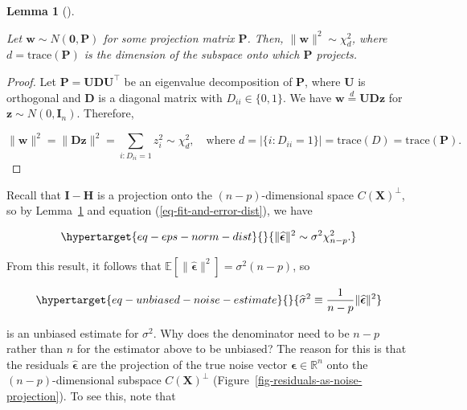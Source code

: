 \documentclass[
  11pt,
  letterpaper,
  oneside]{book}
\theoremstyle{plain}
\newtheorem{lemma}{Lemma}[chapter]
\theoremstyle{plain}
\theoremstyle{definition}
\theoremstyle{definition}
\theoremstyle{plain}
\theoremstyle{remark}
\begin{document}
\begin{lemma}[]\protect\hypertarget{lem-normal-projection}{}\label{lem-normal-projection}

Let \(\boldsymbol{w} \sim N(\boldsymbol{0}, \boldsymbol{P})\) for some
projection matrix \(\boldsymbol{P}\). Then,
\(\|\boldsymbol{w}\|^2 \sim \chi^2_d\), where
\(d = \text{trace}(\boldsymbol{P})\) is the dimension of the subspace
onto which \(\boldsymbol{P}\) projects.

\end{lemma}

\begin{proof}

Let
\(\boldsymbol{P} = \boldsymbol{U} \boldsymbol{D} \boldsymbol{U}^\top\)
be an eigenvalue decomposition of \(\boldsymbol{P}\), where
\(\boldsymbol{U}\) is orthogonal and \(\boldsymbol{D}\) is a diagonal
matrix with \(D_{ii} \in \{0,1\}\). We have
\(\boldsymbol{w} \overset{d}{=} \boldsymbol{U} \boldsymbol{D} \boldsymbol{z}\)
for \(\boldsymbol{z} \sim N(0, \boldsymbol{I}_n)\). Therefore,

\[
\|\boldsymbol{w}\|^2 = \|\boldsymbol{D} \boldsymbol{z}\|^2 = \sum_{i: D_{ii} = 1} z_i^2 \sim \chi^2_d, \quad \text{where } d = |\{i: D_{ii} = 1\}| = \text{trace}(D) = \text{trace}(\boldsymbol{P}).
\]

\end{proof}

Recall that \(\boldsymbol{I} - \boldsymbol{H}\) is a projection onto the
\((n-p)\)-dimensional space \(C(\boldsymbol{X})^\perp\), so by
Lemma~\ref{lem-normal-projection} and equation
(\ref{eq-fit-and-error-dist}), we have

\begin{equation}\protect\hypertarget{eq-eps-norm-dist}{}{
\|\boldsymbol{\widehat{\epsilon}}\|^2 \sim \sigma^2 \chi^2_{n-p}.
}\label{eq-eps-norm-dist}\end{equation}

From this result, it follows that
\(\mathbb{E}[\|\boldsymbol{\widehat{\epsilon}}\|^2] = \sigma^2(n-p)\),
so

\begin{equation}\protect\hypertarget{eq-unbiased-noise-estimate}{}{
\widehat{\sigma}^2 \equiv \frac{1}{n-p}\|\boldsymbol{\widehat{\epsilon}}\|^2
}\label{eq-unbiased-noise-estimate}\end{equation}

is an unbiased estimate for \(\sigma^2\). Why does the denominator need
to be \(n-p\) rather than \(n\) for the estimator above to be unbiased?
The reason for this is that the residuals
\(\boldsymbol{\widehat{\epsilon}}\) are the projection of the true noise
vector \(\boldsymbol{\epsilon} \in \mathbb{R}^n\) onto the
\((n-p)\)-dimensional subspace \(C(\boldsymbol{X})^\perp\)
(Figure~\ref{fig-residuals-as-noise-projection}). To see this, note that
\end{document}
